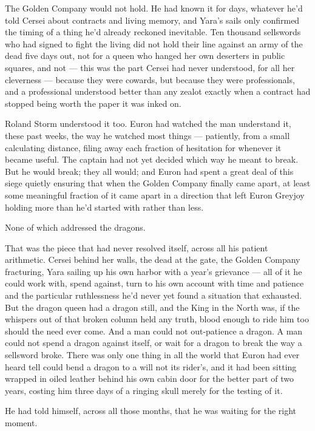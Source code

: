 \sceneBreak

The Golden Company would not hold. He had known it for days, whatever he’d told Cersei about contracts and living memory, and Yara’s sails only confirmed the timing of a thing he’d already reckoned inevitable. Ten thousand sellswords who had signed to fight the living did not hold their line against an army of the dead five days out, not for a queen who hanged her own deserters in public squares, and not — this was the part Cersei had never understood, for all her cleverness — because they were cowards, but because they were professionals, and a professional understood better than any zealot exactly when a contract had stopped being worth the paper it was inked on.

Roland Storm understood it too. Euron had watched the man understand it, these past weeks, the way he watched most things — patiently, from a small calculating distance, filing away each fraction of hesitation for whenever it became useful. The captain had not yet decided which way he meant to break. But he would break; they all would; and Euron had spent a great deal of this siege quietly ensuring that when the Golden Company finally came apart, at least some meaningful fraction of it came apart in a direction that left Euron Greyjoy holding more than he’d started with rather than less.

None of which addressed the dragons.

That was the piece that had never resolved itself, across all his patient arithmetic. Cersei behind her walls, the dead at the gate, the Golden Company fracturing, Yara sailing up his own harbor with a year’s grievance — all of it he could work with, spend against, turn to his own account with time and patience and the particular ruthlessness he’d never yet found a situation that exhausted. But the dragon queen had a dragon still, and the King in the North was, if the whispers out of that broken column held any truth, blood enough to ride him too should the need ever come. And a man could not out-patience a dragon. A man could not spend a dragon against itself, or wait for a dragon to break the way a sellsword broke. There was only one thing in all the world that Euron had ever heard tell could bend a dragon to a will not its rider’s, and it had been sitting wrapped in oiled leather behind his own cabin door for the better part of two years, costing him three days of a ringing skull merely for the testing of it.

He had told himself, across all those months, that he was waiting for the right moment.

